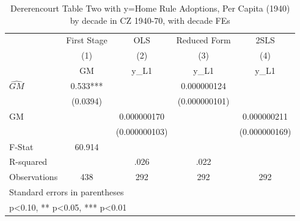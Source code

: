\begin{table}[htbp]\centering
\def\sym#1{\ifmmode^{#1}\else\(^{#1}\)\fi}
\caption{Dererencourt Table Two with y=Home Rule Adoptions, Per Capita (1940) by decade in CZ 1940-70, with decade FEs}
\begin{tabular}{l*{4}{c}}
\toprule
                    & First Stage   &         OLS   &Reduced Form   &        2SLS   \\
                    &\multicolumn{1}{c}{(1)}&\multicolumn{1}{c}{(2)}&\multicolumn{1}{c}{(3)}&\multicolumn{1}{c}{(4)}\\
                    &\multicolumn{1}{c}{GM}&\multicolumn{1}{c}{y\_L1}&\multicolumn{1}{c}{y\_L1}&\multicolumn{1}{c}{y\_L1}\\
\midrule
$\hat{GM}$          &       0.533***&               & 0.000000124   &               \\
                    &    (0.0394)   &               &(0.000000101)   &               \\
\addlinespace
GM                  &               & 0.000000170   &               & 0.000000211   \\
                    &               &(0.000000103)   &               &(0.000000169)   \\
\midrule
F-Stat              &      60.914   &               &               &               \\
R-squared           &               &        .026   &        .022   &               \\
Observations        &         438   &         292   &         292   &         292   \\
\bottomrule
\multicolumn{5}{l}{\footnotesize Standard errors in parentheses}\\
\multicolumn{5}{l}{\footnotesize * p<0.10, ** p<0.05, *** p<0.01}\\
\end{tabular}
\end{table}

